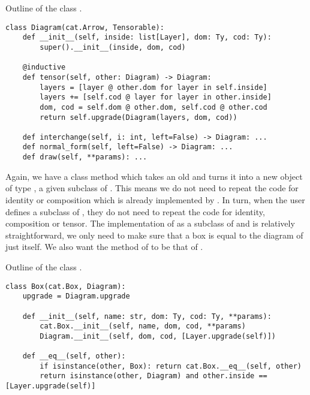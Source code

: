 \begin{python}\label{listing:monoidal.Diagram}
{\normalfont Outline of the class .}
\begin{verbatim}
class Diagram(cat.Arrow, Tensorable):
    def __init__(self, inside: list[Layer], dom: Ty, cod: Ty):
        super().__init__(inside, dom, cod)

    @inductive
    def tensor(self, other: Diagram) -> Diagram:
        layers = [layer @ other.dom for layer in self.inside]
        layers += [self.cod @ layer for layer in other.inside]
        dom, cod = self.dom @ other.dom, self.cod @ other.cod
        return self.upgrade(Diagram(layers, dom, cod))

    def interchange(self, i: int, left=False) -> Diagram: ...
    def normal_form(self, left=False) -> Diagram: ...
    def draw(self, **params): ...
\end{verbatim}
\end{python}

Again, we have a class method  which takes an old  and turns it into a new object of type , a given subclass of .
This means we do not need to repeat the code for identity or composition which is already implemented by .
In turn, when the user defines a subclass of , they do not need to repeat the code for identity, composition or tensor.
The implementation of  as a subclass of  and  is relatively straightforward, we only need to make sure that a box is equal to the diagram of just itself.
We also want the  method of  to be that of .

\begin{python}
{\normalfont Outline of the class .}
\begin{verbatim}
class Box(cat.Box, Diagram):
    upgrade = Diagram.upgrade

    def __init__(self, name: str, dom: Ty, cod: Ty, **params):
        cat.Box.__init__(self, name, dom, cod, **params)
        Diagram.__init__(self, dom, cod, [Layer.upgrade(self)])

    def __eq__(self, other):
        if isinstance(other, Box): return cat.Box.__eq__(self, other)
        return isinstance(other, Diagram) and other.inside == [Layer.upgrade(self)]
\end{verbatim}
\end{python}

